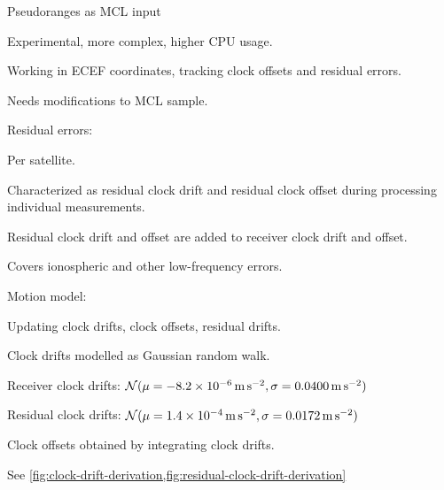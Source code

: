 \begin{compactitem}
\item
Pseudoranges as MCL input
\begin{compactitem}
    \item
    Experimental, more complex, higher CPU usage.

    \item
    Working in ECEF coordinates, tracking clock offsets and residual errors.

    \item
    Needs modifications to MCL sample.

    \item
    Residual errors:
    \begin{compactitem}
        \item Per satellite.
        \item Characterized as residual clock drift and residual clock offset
              during processing individual measurements.
        \item Residual clock drift and offset are added to receiver clock drift and offset.
        \item Covers ionospheric and other low-frequency errors.
    \end{compactitem}

    \item
    Motion model:
    \begin{compactitem}
        \item Updating clock drifts, clock offsets, residual drifts.
        \item Clock drifts modelled as Gaussian random walk.
        \begin{compactitem}
            \item Receiver clock drifts:
                  \(\operatorname{\mathcal{N}}(\mu = \SI{-8.2e-06}{\meter\per\second\squared}, \sigma = \SI{0.0400}{\meter\per\second\squared})\)
            \item Residual clock drifts:
                  \(\operatorname{\mathcal{N}}(\mu = \SI{1.4e-4}{\meter\per\second\squared}, \sigma = \SI{0.0172}{\meter\per\second\squared})\)
        \end{compactitem}
        \item Clock offsets obtained by integrating clock drifts.
        \item See \cref{fig:clock-drift-derivation,fig:residual-clock-drift-derivation}
    \end{compactitem}


\end{compactitem}
\end{compactitem}
